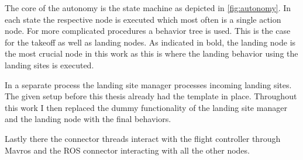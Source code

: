 The core of the autonomy is the state machine as depicted in \cref{fig:autonomy}. In each state the respective node is executed which most often is a single action node. For more complicated procedures a behavior tree is used. This is the case for the takeoff as well as landing nodes. As indicated in bold, the landing node is the most crucial node in this work as this is where the landing behavior using the landing sites is executed.

In a separate process the landing site manager processes incoming landing sites. The given setup before this thesis already had the template in place. Throughout this work I then replaced the dummy functionality of the landing site manager and the landing node with the final behaviors.

Lastly there the connector threads interact with the flight controller through Mavros and the ROS connector interacting with all the other nodes.








